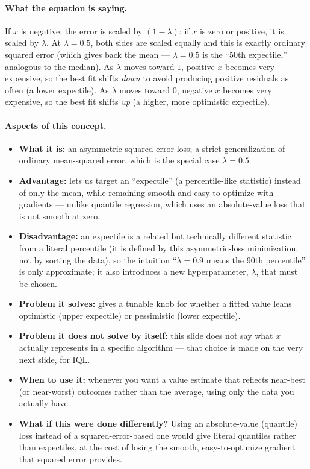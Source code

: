 \documentclass[11pt]{article}
\begin{document}
\paragraph{What the equation is saying.}
If $x$ is negative, the error is scaled by $(1-\lambda)$; if $x$ is zero or positive, it
is scaled by $\lambda$. At $\lambda=0.5$, both sides are scaled equally and this is
exactly ordinary squared error (which gives back the mean --- $\lambda = 0.5$ is the
``50th expectile,'' analogous to the median). As $\lambda$ moves toward $1$, positive
$x$ becomes very expensive, so the best fit shifts \emph{down} to avoid producing
positive residuals as often (a lower expectile). As $\lambda$ moves toward $0$, negative
$x$ becomes very expensive, so the best fit shifts \emph{up} (a higher, more optimistic
expectile).

\paragraph{Aspects of this concept.}
\begin{itemize}
\item \textbf{What it is:} an asymmetric squared-error loss; a strict generalization of
ordinary mean-squared error, which is the special case $\lambda=0.5$.
\item \textbf{Advantage:} lets us target an ``expectile'' (a percentile-like statistic)
instead of only the mean, while remaining smooth and easy to optimize with gradients ---
unlike quantile regression, which uses an absolute-value loss that is not smooth at
zero.
\item \textbf{Disadvantage:} an expectile is a related but technically different
statistic from a literal percentile (it is defined by this asymmetric-loss minimization,
not by sorting the data), so the intuition ``$\lambda=0.9$ means the 90th percentile'' is
only approximate; it also introduces a new hyperparameter, $\lambda$, that must be
chosen.
\item \textbf{Problem it solves:} gives a tunable knob for whether a fitted value leans
optimistic (upper expectile) or pessimistic (lower expectile).
\item \textbf{Problem it does not solve by itself:} this slide does not say what $x$
actually represents in a specific algorithm --- that choice is made on the very next
slide, for IQL.
\item \textbf{When to use it:} whenever you want a value estimate that reflects
near-best (or near-worst) outcomes rather than the average, using only the data you
actually have.
\item \textbf{What if this were done differently?} Using an absolute-value (quantile)
loss instead of a squared-error-based one would give literal quantiles rather than
expectiles, at the cost of losing the smooth, easy-to-optimize gradient that squared
error provides.
\end{itemize}
\end{document}
